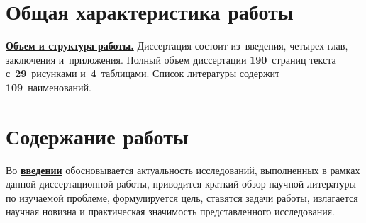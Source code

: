 
\section*{Общая характеристика работы}

\newcommand{\actuality}{\underline{\textbf{\actualityTXT}}}
\newcommand{\progress}{\underline{\textbf{\progressTXT}}}
\newcommand{\aim}{\underline{{\textbf\aimTXT}}}
\newcommand{\tasks}{\underline{\textbf{\tasksTXT}}}
\newcommand{\novelty}{\underline{\textbf{\noveltyTXT}}}
\newcommand{\influence}{\underline{\textbf{\influenceTXT}}}
\newcommand{\methods}{\underline{\textbf{\methodsTXT}}}
\newcommand{\defpositions}{\underline{\textbf{\defpositionsTXT}}}
\newcommand{\reliability}{\underline{\textbf{\reliabilityTXT}}}
\newcommand{\probation}{\underline{\textbf{\probationTXT}}}
\newcommand{\contribution}{\underline{\textbf{\contributionTXT}}}
\newcommand{\publications}{\underline{\textbf{\publicationsTXT}}}

\newcommand{\ccite}[1]{}
\newcommand{\cscite}[1]{}


\underline{\textbf{Объем и структура работы.}} Диссертация состоит из~введения, четырех глав, заключения и~приложения. Полный объем диссертации \textbf{190}~страниц текста с~\textbf{29}~рисунками и~\textbf{4}~таблицами. Список литературы содержит \textbf{109}~наименований.

\section*{Содержание работы}
Во \underline{\textbf{введении}} обосновывается актуальность
исследований, выполненных в рамках данной диссертационной работы,
приводится краткий обзор научной литературы по изучаемой проблеме,
формулируется цель, ставятся задачи работы, излагается научная новизна
и практическая значимость представленного исследования.

